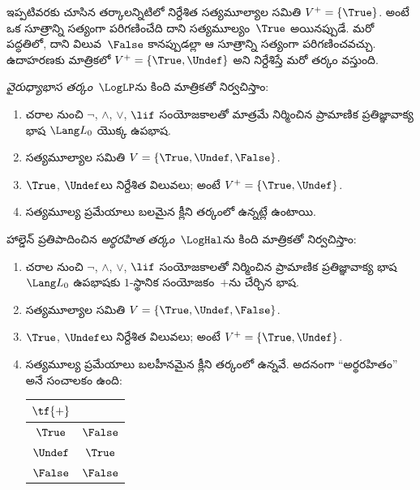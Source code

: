 \documentclass[../../../include/open-logic-section]{subfiles}
\begin{document}


ఇప్పటివరకు చూసిన తర్కాలన్నిటిలో నిర్దేశిత
సత్యమూల్యాల సమితి $V^+ = \{\True\}$.
అంటే ఒక సూత్రాన్ని సత్యంగా పరిగణించేది దాని సత్యమూల్యం~$\True$
అయినప్పుడే. మరో పద్ధతిలో, దాని విలువ~$\False$ కానప్పుడల్లా
ఆ సూత్రాన్ని సత్యంగా పరిగణించవచ్చు.
ఉదాహరణకు మాత్రికలో $V^+ = \{\True, \Undef\}$
అని నిర్దేశిస్తే మరో తర్కం వస్తుంది.

\begin{defn}
\emph{వైరుధ్యాభాస తర్కం}~$\LogLP$ను కింది
మాత్రికతో నిర్వచిస్తాం:
\begin{enumerate}
  \item చరాల నుంచి $\lnot$, $\land$, $\lor$, $\lif$
  సంయోజకాలతో మాత్రమే నిర్మించిన ప్రామాణిక
  ప్రతిజ్ఞావాక్య భాష $\Lang L_0$ యొక్క ఉపభాష.
  \item సత్యమూల్యాల సమితి $V = \{\True, \Undef, \False\}$.
  \item $\True$, $\Undef$లు నిర్దేశిత విలువలు;
  అంటే $V^+ = \{\True, \Undef\}$.
  \item సత్యమూల్య ప్రమేయాలు బలమైన క్లీని
  తర్కంలో ఉన్నట్లే ఉంటాయి.
\end{enumerate}
\end{defn}

\begin{defn}
హాల్డెన్ ప్రతిపాదించిన \emph{అర్థరహిత తర్కం}~$\LogHal$ను
కింది మాత్రికతో నిర్వచిస్తాం:
\begin{enumerate}
  \item చరాల నుంచి $\lnot$, $\land$, $\lor$, $\lif$
  సంయోజకాలతో నిర్మించిన ప్రామాణిక
  ప్రతిజ్ఞావాక్య భాష $\Lang L_0$ ఉపభాషకు
  $1$-స్థానిక సంయోజకం~$+$ను చేర్చిన భాష.
  \item సత్యమూల్యాల సమితి $V = \{\True, \Undef, \False\}$.
  \item $\True$, $\Undef$లు నిర్దేశిత విలువలు;
  అంటే $V^+ = \{\True, \Undef\}$.
  \item సత్యమూల్య ప్రమేయాలు బలహీనమైన క్లీని
  తర్కంలో ఉన్నవే. అదనంగా
  “అర్థరహితం” అనే సంచాలకం ఉంది:
  \begin{center}
    \begin{tabular}{c|c}
    $\tf{+}$ & \\
    \hline
    $\True$ & $\False$ \\
    $\Undef$ & $\True$ \\
    $\False$ & $\False$
    \end{tabular}
  \end{center}
\end{enumerate}
\end{defn}
\end{document}
